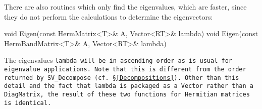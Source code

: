 There are also routines which only find the eigenvalues, which are faster, since they
do not perform the calculations to determine the eigenvectors:
\begin{tmvcode}
void Eigen(const HermMatrix<T>& A, Vector<RT>& lambda)
void Eigen(const HermBandMatrix<T>& A, Vector<RT>& lambda)
\end{tmvcode}

The eigenvalues \tt{lambda} will be in ascending order as is usual for eigenvalue
applications.  Note that this is different from the order returned by \tt{SV\_Decompose}
(cf. \S\ref{Decompositions}).
Other than this detail and the fact that \tt{lambda}
is packaged as a \tt{Vector} rather than a \tt{DiagMatrix}, the result of these two
functions for Hermitian matrices is identical.
